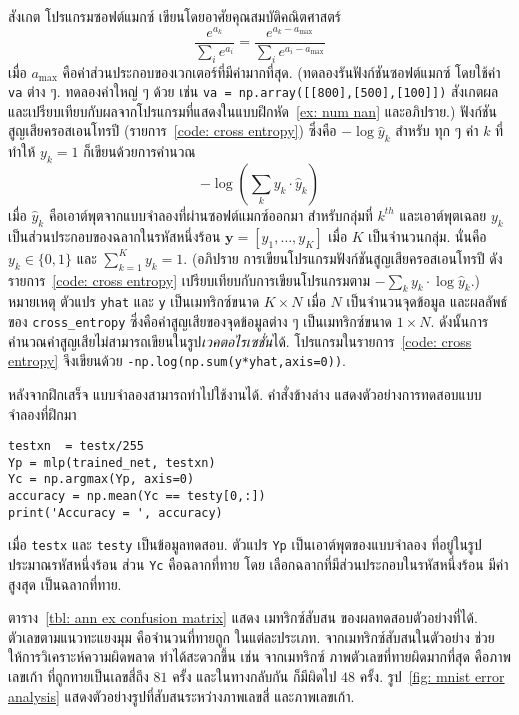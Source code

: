 \begin{Exercise}
สังเกต โปรแกรมซอฟต์แมกซ์ เขียนโดยอาศัยคุณสมบัติคณิตศาสตร์
\[
\frac{e^{a_k}}{\sum_i e^{a_i}} = \frac{e^{a_k - a_{\max}}}{\sum_i e^{a_i - a_{\max}}}
\nonumber
\]
เมื่อ $a_{\max}$ คือค่าส่วนประกอบของเวกเตอร์ที่มีค่ามากที่สุด.
(ทดลองรันฟังก์ชันซอฟต์แมกซ์ 
โดยใช้ค่า \verb|va| ต่าง ๆ.
ทดลองค่าใหญ่ ๆ ด้วย เช่น \verb|va = np.array([[800],[500],[100]])|
สังเกตผล 
และเปรียบเทียบกับผลจากโปรแกรมที่แสดงในแบบฝึกหัด~\ref{ex: num nan}
และอภิปราย.)
ฟังก์ชันสูญเสียครอสเอนโทรปี (รายการ~\ref{code: cross entropy})
ซึ่งคือ $-\log \hat{y}_k$ สำหรับ ทุก ๆ ค่า $k$ ที่ทำให้ $y_k = 1$
ก็เขียนด้วยการคำนวณ
\[
-\log\left( \sum_k y_k \cdot \hat{y}_k\right)
\]
เมื่อ $\hat{y}_k$ คือเอาต์พุตจากแบบจำลองที่ผ่านซอฟต์แมกซ์ออกมา สำหรับกลุ่มที่ $k^{th}$
และเอาต์พุตเฉลย $y_k$ เป็นส่วนประกอบของฉลากในรหัสหนึ่งร้อน $\bm{y} = [y_1, \ldots, y_K]$ เมื่อ $K$ เป็นจำนวนกลุ่ม.
นั่นคือ $y_k \in \{0, 1\}$ และ $\sum_{k=1}^K y_k = 1$.
(อภิปราย การเขียนโปรแกรมฟังก์ชันสูญเสียครอสเอนโทรปี ดังรายการ~\ref{code: cross entropy} 
เปรียบเทียบกับการเขียนโปรแกรมตาม $-\sum_k y_k \cdot \log \hat{y}_k$.)
หมายเหตุ ตัวแปร \verb|yhat| และ \verb|y| เป็นเมทริกซ์ขนาด $K \times N$ เมื่อ $N$ เป็นจำนวนจุดข้อมูล
และผลลัพธ์ของ \verb|cross_entropy| ซึ่งคือค่าสูญเสียของจุดข้อมูลต่าง ๆ เป็นเมทริกซ์ขนาด $1 \times N$.
ดังนั้นการคำนวณค่าสูญเสียไม่สามารถเขียนในรูป\textit{เวคตอไรเซชั่น}ได้.
โปรแกรมในรายการ~\ref{code: cross entropy} จึงเขียนด้วย \verb|-np.log(np.sum(y*yhat,axis=0))|.





หลังจากฝึกเสร็จ
แบบจำลองสามารถทำไปใช้งานได้.
คำสั่งข้างล่าง 
แสดงตัวอย่างการทดสอบแบบจำลองที่ฝึกมา
\begin{Verbatim}[fontsize=\small]
testxn  = testx/255
Yp = mlp(trained_net, testxn)
Yc = np.argmax(Yp, axis=0)
accuracy = np.mean(Yc == testy[0,:])
print('Accuracy = ', accuracy)
\end{Verbatim}
เมื่อ \verb|testx| และ \verb|testy| เป็นข้อมูลทดสอบ.
ตัวแปร \verb|Yp| 
เป็นเอาต์พุตของแบบจำลอง
ที่อยู๋ในรูปประมาณรหัสหนึ่งร้อน
ส่วน \verb|Yc| คือฉลากที่ทาย
โดย
เลือกฉลากที่มีส่วนประกอบในรหัสหนึ่งร้อน
มีค่าสูงสุด เป็นฉลากที่ทาย.

ตาราง~\ref{tbl: ann ex confusion matrix} แสดง
เมทริกซ์สับสน ของผลทดสอบตัวอย่างที่ได้.
ตัวเลขตามแนวทะแยงมุม คือจำนวนที่ทายถูก
ในแต่ละประเภท.
จากเมทริกซ์สับสนในตัวอย่าง
ช่วยให้การวิเคราะห์ความผิดพลาด
ทำได้สะดวกขึ้น
เช่น จากเมทริกซ์ ภาพตัวเลขที่ทายผิดมากที่สุด คือภาพเลขเก้า ที่ถูกทายเป็นเลขสี่ถึง $81$ ครั้ง
และในทางกลับกัน ก็มีผิดไป $48$ ครั้ง.
รูป~\ref{fig: mnist error analysis}
แสดงตัวอย่างรูปที่สับสนระหว่างภาพเลขสี่
และภาพเลขเก้า.

\end{Exercise}

